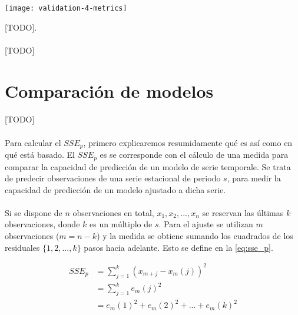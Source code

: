 \documentclass[a4paper, spanish]{article}
\begin{document}
      \begin{table}[htb!]
        \centering
        \texttt{[image: validation-4-metrics]}
        \caption{[TODO].}
        \label{}
      \end{table}

      \paragraph{}
      [TODO]


  \section{Comparación de modelos}
  \label{sec:comparison}
    \paragraph{}
    [TODO]


    \paragraph{}
    Para calcular el $SSE_p$, primero explicaremos resumidamente qué es así como en qué está basado. El $SSE_p$ es se corresponde con el cálculo de una medida para comparar la capacidad de predicción de un modelo de serie temporale. Se trata de predecir observaciones de una serie estacional de periodo $s$, para medir la capacidad de predicción de un modelo ajustado a dicha serie.

    \paragraph{}
    Si se dispone de $n$ observaciones en total, $x_1, x_2, ..., x_n$ se reservan las últimas $k$ observaciones, donde $k$ es un múltiplo de $s$. Para el ajuste se utilizan $m$ observaciones ($m = n - k$) y la medida se obtiene sumando los cuadrados de los residuales $\{1, 2, ..., k\}$ pasos hacia adelante. Esto se define en la \autoref{eq:sse_p}.

    \begin{equation}
    \label{eq:sse_p}
      \begin{split}
        SSE_p
        &= \sum_{j = 1} ^ k (x_{m + j} - x_{m}(j)) ^ 2 \\
        &= \sum_{j = 1} ^ k e_m(j) ^ 2 \\
        &= e_m(1) ^ 2 + e_m(2) ^ 2 + ... + e_m(k) ^ 2
      \end{split}
    \end{equation}
\end{document}
